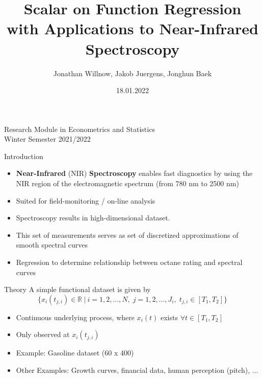 \documentclass{beamer}
\title{Scalar on Function Regression \\
with Applications to Near-Infrared Spectroscopy}
\author{Jonathan Willnow, Jakob Juergens, Jonghun Baek}
\date{18.01.2022}
\begin{document}
	
	\begin{frame}
		\titlepage 
		\begin{center}
			{\small
			Research Module in Econometrics and Statistics \\
			Winter Semester 2021/2022}
		\end{center}
	\end{frame}
	
	\logo{}
	
	
	\begin{frame}{Introduction}
	
		\begin{itemize}
			\item \textbf{Near-Infrared} (NIR) \textbf{Spectroscopy} enables fast diagnostics by using the NIR region of the electromagnetic spectrum (from 780 nm to 2500 nm)
			\item Suited for field-monitoring / on-line analysis
			\item Spectroscopy results in high-dimensional dataset.	
			\item This set of measurements serves as set of discretized approximations of smooth spectral curves
			\item Regression to determine relationship between octane rating and spectral curves
			\end{itemize}
	\end{frame}
	
	\begin{frame}{Theory}
		A simple functional dataset is given by 
		$$\{x_{i}(t_{j,i}) \in \mathbb{R} \: \vert \: i = 1,2,...,N, \; j = 1,2,..., J_i, \; t_{j,i} \in [T_1, T_2] \}$$
		
		\begin{itemize}
			\item Continuous underlying process, where $x_i(t)$ exists $\forall t \in [T_1, T_2]$
			\item Only observed at $x_{i}(t_{j,i})$
			\item Example: Gasoline dataset (60 x 400)
			\item Other Examples: Growth curves, financial data, human perception (pitch), ...
			
		\end{itemize}
	\end{frame}
\end{document}
